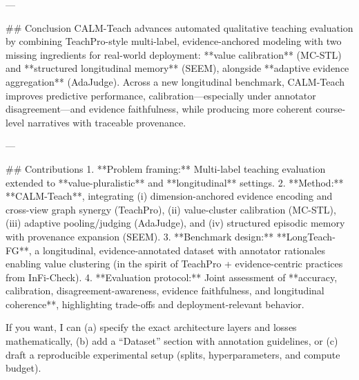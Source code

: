 ---

## Conclusion  
CALM-Teach advances automated qualitative teaching evaluation by combining TeachPro-style multi-label, evidence-anchored modeling with two missing ingredients for real-world deployment: **value calibration** (MC-STL) and **structured longitudinal memory** (SEEM), alongside **adaptive evidence aggregation** (AdaJudge). Across a new longitudinal benchmark, CALM-Teach improves predictive performance, calibration—especially under annotator disagreement—and evidence faithfulness, while producing more coherent course-level narratives with traceable provenance.

---

## Contributions  
1. **Problem framing:** Multi-label teaching evaluation extended to **value-pluralistic** and **longitudinal** settings.  
2. **Method:** **CALM-Teach**, integrating (i) dimension-anchored evidence encoding and cross-view graph synergy (TeachPro), (ii) value-cluster calibration (MC-STL), (iii) adaptive pooling/judging (AdaJudge), and (iv) structured episodic memory with provenance expansion (SEEM).  
3. **Benchmark design:** **LongTeach-FG**, a longitudinal, evidence-annotated dataset with annotator rationales enabling value clustering (in the spirit of TeachPro + evidence-centric practices from InFi-Check).  
4. **Evaluation protocol:** Joint assessment of **accuracy, calibration, disagreement-awareness, evidence faithfulness, and longitudinal coherence**, highlighting trade-offs and deployment-relevant behavior.

If you want, I can (a) specify the exact architecture layers and losses mathematically, (b) add a “Dataset” section with annotation guidelines, or (c) draft a reproducible experimental setup (splits, hyperparameters, and compute budget).